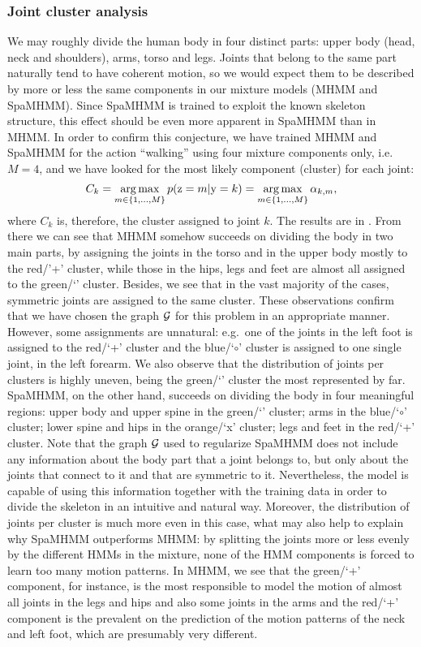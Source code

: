 \subsubsection{Joint cluster analysis}
\label{sec:spamhmm_cluster}
We may roughly divide the human body in four distinct parts: upper body (head, neck and shoulders), arms, torso and legs. Joints that belong to the same part naturally tend to have coherent motion, so we would expect them to be described by more or less the same components in our mixture models (MHMM and SpaMHMM). Since SpaMHMM is trained to exploit the known skeleton structure, this effect should be even more apparent in SpaMHMM than in MHMM. In order to confirm this conjecture, we have trained MHMM and SpaMHMM for the action ``walking'' using four mixture components only, i.e.\ $M=4$, and we have looked for the most likely component (cluster) for each joint:
\begin{equation}
C_k = \operatorname*{arg\,max}_{m \in \{1,...,M\}} p({\textnormal{z}}=m | {\textnormal{y}}=k) = \operatorname*{arg\,max}_{m \in \{1,...,M\}} \alpha_{k,m},
\end{equation}
where $C_k$ is, therefore, the cluster assigned to joint $k$. The results are in . From there we can see that MHMM somehow succeeds on dividing the body in two main parts, by assigning the joints in the torso and in the upper body mostly to the red/'+' cluster, while those in the hips, legs and feet are almost all assigned to the green/`\SmallTriangleUp' cluster. Besides, we see that in the vast majority of the cases, symmetric joints are assigned to the same cluster. These observations confirm that we have chosen the graph ${\mathcal{G}}$ for this problem in an appropriate manner. However, some assignments are unnatural: e.g.\  one of the joints in the left foot is assigned to the red/`+' cluster and the blue/`$\circ$' cluster is assigned to one single joint, in the left forearm. We also observe that the distribution of joints per clusters is highly uneven, being the green/`\SmallTriangleUp' cluster the most represented by far. SpaMHMM, on the other hand, succeeds on dividing the body in four meaningful regions: upper body and upper spine in the green/`\SmallTriangleUp' cluster; arms in the blue/`$\circ$' cluster; lower spine and hips in the orange/`x' cluster; legs and feet in the red/`+' cluster. Note that the graph ${\mathcal{G}}$ used to regularize SpaMHMM does not include any information about the body part that a joint belongs to, but only about the joints that connect to it and that are symmetric to it. Nevertheless, the model is capable of using this information together with the training data in order to divide the skeleton in an intuitive and natural way. Moreover, the distribution of joints per cluster is much more even in this case, what may also help to explain why SpaMHMM outperforms MHMM: by splitting the joints more or less evenly by the different HMMs in the mixture, none of the HMM components is forced to learn too many motion patterns. In MHMM, we see that the green/`+' component, for instance, is the most responsible to model the motion of almost all joints in the legs and hips and also some joints in the arms and the red/`+' component is the prevalent on the prediction of the motion patterns of the neck and left foot, which are presumably very different.

